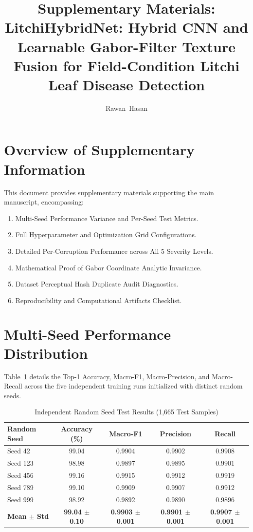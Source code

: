 \documentclass[journal]{IEEEtran}
\begin{document}
\title{Supplementary Materials: LitchiHybridNet: Hybrid CNN and Learnable Gabor-Filter Texture Fusion for Field-Condition Litchi Leaf Disease Detection}

\author{Rawan~Hasan}

\maketitle

\section{Overview of Supplementary Information}
This document provides supplementary materials supporting the main manuscript, encompassing:
\begin{enumerate}
    \item Multi-Seed Performance Variance and Per-Seed Test Metrics.
    \item Full Hyperparameter and Optimization Grid Configurations.
    \item Detailed Per-Corruption Performance across All 5 Severity Levels.
    \item Mathematical Proof of Gabor Coordinate Analytic Invariance.
    \item Dataset Perceptual Hash Duplicate Audit Diagnostics.
    \item Reproducibility and Computational Artifacts Checklist.
\end{enumerate}

\section{Multi-Seed Performance Distribution}
Table~\ref{tab:supp_seeds} details the Top-1 Accuracy, Macro-F1, Macro-Precision, and Macro-Recall across the five independent training runs initialized with distinct random seeds.

\begin{table}[h]
\centering
\caption{Independent Random Seed Test Results (1,665 Test Samples)}
\label{tab:supp_seeds}
\begin{tabular}{lcccc}
\toprule
\textbf{Random Seed} & \textbf{Accuracy (\%)} & \textbf{Macro-F1} & \textbf{Precision} & \textbf{Recall} \\
\midrule
Seed 42 & 99.04 & 0.9904 & 0.9902 & 0.9908 \\
Seed 123 & 98.98 & 0.9897 & 0.9895 & 0.9901 \\
Seed 456 & 99.16 & 0.9915 & 0.9912 & 0.9919 \\
Seed 789 & 99.10 & 0.9909 & 0.9907 & 0.9912 \\
Seed 999 & 98.92 & 0.9892 & 0.9890 & 0.9896 \\
\midrule
\textbf{Mean $\pm$ Std} & \textbf{99.04 $\pm$ 0.10} & \textbf{0.9903 $\pm$ 0.001} & \textbf{0.9901 $\pm$ 0.001} & \textbf{0.9907 $\pm$ 0.001} \\
\bottomrule
\end{tabular}
\end{table}
\end{document}
